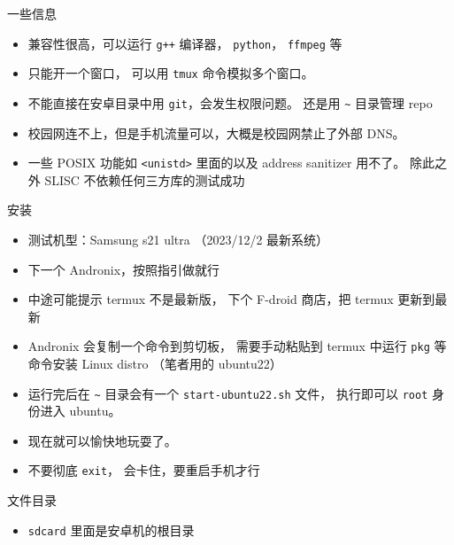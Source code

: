 
一些信息
\begin{itemize}
\item 兼容性很高，可以运行 \verb`g++` 编译器， \verb`python`， \verb`ffmpeg` 等
\item 只能开一个窗口， 可以用 \verb`tmux` 命令模拟多个窗口。
\item 不能直接在安卓目录中用 \verb`git`，会发生权限问题。 还是用 \verb`~` 目录管理 repo
\item 校园网连不上，但是手机流量可以，大概是校园网禁止了外部 DNS。
\item 一些 POSIX 功能如 \verb`<unistd>` 里面的以及 address sanitizer 用不了。 除此之外 SLISC 不依赖任何三方库的测试成功
\end{itemize}

安装
\begin{itemize}
\item 测试机型：Samsung s21 ultra （2023/12/2 最新系统）
\item 下一个 Andronix，按照指引做就行
\item 中途可能提示 termux 不是最新版， 下个 F-droid 商店，把 termux 更新到最新
\item Andronix 会复制一个命令到剪切板， 需要手动粘贴到 termux 中运行 \verb`pkg` 等命令安装 Linux distro （笔者用的 ubuntu22）
\item 运行完后在 \verb`~` 目录会有一个 \verb`start-ubuntu22.sh` 文件， 执行即可以 \verb`root` 身份进入 ubuntu。
\item 现在就可以愉快地玩耍了。
\item 不要彻底 \verb`exit`， 会卡住，要重启手机才行
\end{itemize}


文件目录
\begin{itemize}
\item \verb`sdcard` 里面是安卓机的根目录
\end{itemize}

